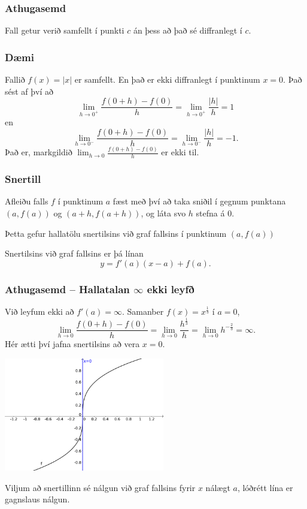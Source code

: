 \documentclass[icelandic,a4paper,12pt]{article}
\begin{document}
\subsubsection{Athugasemd}
Fall getur verið samfellt í punkti $c$ án þess að það sé
diffranlegt í $c$.

\subsubsection{Dæmi} Fallið $f(x) = |x|$ er samfellt. En það er ekki diffranlegt í 
punktinum $x=0$. \pause Það sést af því að
$$
\lim_{h\to 0^+} \frac{f(0+h)-f(0)}{h} = \lim_{h\to 0^+} \frac{|h|}{h}
= 1
$$
\pause
en
$$
\lim_{h\to 0^-} \frac{f(0+h)-f(0)}{h} = \lim_{h\to 0^-} \frac{|h|}{h}
= -1.
$$
\pause
Það er, markgildið $\lim_{h\to 0} \frac{f(0+h)-f(0)}{h}$ er ekki til.

\subsubsection{Snertill}
 Afleiðu falls $f$ í punktinum $a$ fæst með því að 
 taka sniðil í gegnum punktana $(a,f(a))$ og $(a+h,f(a+h))$, og láta
 svo $h$ stefna á $0$. 
  
 Þetta gefur hallatölu snertilsins við graf fallsins í punktinum $(a,f(a))$
 
 Snertilsins við graf fallsins er þá línan
 \begin{equation*}
	y = f'(a)(x-a) + f(a).
 \end{equation*}
 
\subsubsection{Athugasemd -- Hallatalan $\infty$ ekki leyfð}
Við leyfum ekki að $f'(a) = \infty$. \pause Samanber 
$f(x) = x^{\frac 13}$ í $a=0$,\pause
\begin{equation*}
	\lim_{h \to 0} \frac{f(0+h)-f(0)}h = 
	\lim_{h \to 0} \frac{h^{\frac 13}}h = 
	\lim_{h \to 0} h^{-\frac 23} = \infty.
\end{equation*}
\pause
Hér ætti því jafna snertilsins að vera $x=0$.
\begin{center}
 \includegraphics[width=7cm,keepaspectratio=true]{./myndir/kafli03/01_x13.png}
\end{center}
\pause
Viljum að snertillinn sé nálgun við graf fallsins 
fyrir $x$ nálægt $a$, lóðrétt lína er gagnslaus nálgun.
\end{document}
